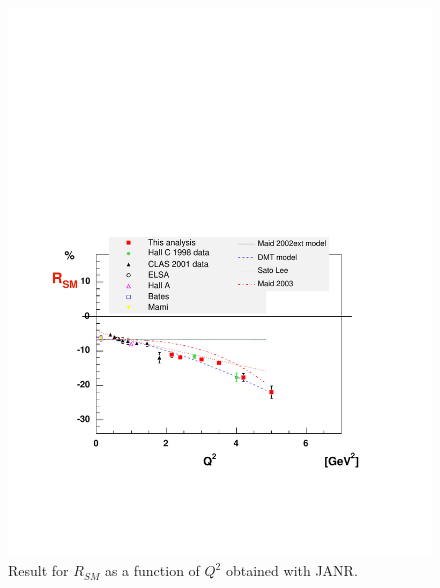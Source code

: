 \begin{figure}[h]
 \begin{center}
 \includegraphics[width = 13cm, bb=30 130 540 500]{analysis/img/JANR_RSM} 
  \caption[JANR result for $R_{SM}$ as a function of $Q^2$]
{  Result for $R_{SM}$ as a function of $Q^2$ obtained with JANR.}
 \label{fig:JANRRSM}
\end{center}
\end{figure}

